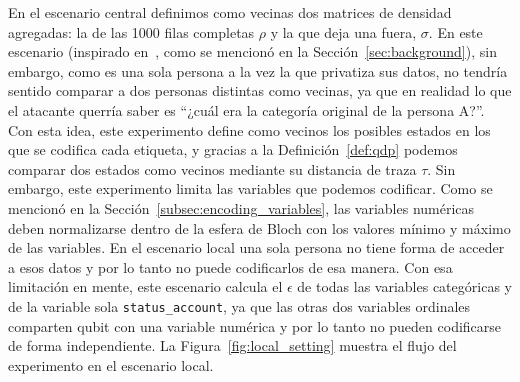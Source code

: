 \documentclass{ieeeaccess}
\begin{document}
En el escenario central definimos como vecinas dos matrices de densidad agregadas: la de las 1000 filas completas $\rho$ y la que deja una fuera, $\sigma$. En este escenario (inspirado en~\cite[Def.~12.1]{dwork2014algorithmic}, como se mencionó en la Sección~\ref{sec:background}), sin embargo, como es una sola persona a la vez la que privatiza sus datos, no tendría sentido comparar a dos personas distintas como vecinas, ya que en realidad lo que el atacante querría saber es ``¿cuál era la categoría original de la persona A?''. Con esta idea, este experimento define como vecinos los posibles estados en los que se codifica cada etiqueta, y gracias a la Definición~\ref{def:qdp} podemos comparar dos estados como vecinos mediante su distancia de traza $\tau$. Sin embargo, este experimento limita las variables que podemos codificar. Como se mencionó en la Sección~\ref{subsec:encoding_variables}, las variables numéricas deben normalizarse dentro de la esfera de Bloch con los valores mínimo y máximo de las variables. En el escenario local una sola persona no tiene forma de acceder a esos datos y por lo tanto no puede codificarlos de esa manera. Con esa limitación en mente, este escenario calcula el $\epsilon$ de todas las variables categóricas y de la variable sola \texttt{status\_account}, ya que las otras dos variables ordinales comparten qubit con una variable numérica y por lo tanto no pueden codificarse de forma independiente. La Figura~\ref{fig:local_setting} muestra el flujo del experimento en el escenario local.
\end{document}
